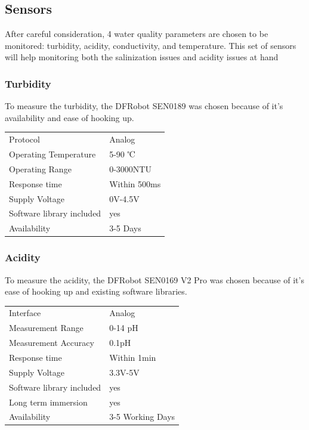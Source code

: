 \newpage
\subsection{Sensors}
After careful consideration, 4 water quality parameters are chosen to be monitored: turbidity, acidity, conductivity, and temperature. This set of sensors will help monitoring both the salinization issues and acidity issues at hand

\subsubsection{Turbidity}
To measure the turbidity, the DFRobot SEN0189 \cite{SEN0189} was chosen because of it's availability and ease of hooking up.
\begin{table}[h!]
	\centering
	\quad
	\begin{tabular}{| l | l |}
    \hline
    Protocol & Analog\\
    Operating Temperature & 5-90 ℃ \\
    Operating Range &  0-3000NTU\\
    Response time & Within 500ms \\
    Supply Voltage & 0V-4.5V \\
    Software library included & yes \\
    Availability & 3-5 Days \\
    \hline
	\end{tabular}
\end{table}

\subsubsection{Acidity}
To measure the acidity, the DFRobot SEN0169 V2 Pro \cite{SEN0169V2} was chosen because of it's ease of hooking up and existing software libraries.
\begin{table}[h!]
	\centering
	\quad
	\begin{tabular}{| l | l |}
    \hline
    Interface & Analog \\
    Measurement Range & 0-14 pH \\
    Measurement Accuracy &  0.1pH \\
    Response time & Within 1\gls{min} \\
    Supply Voltage & 3.3V-5V \\
    Software library included & yes \\
    Long term immersion & yes \\
    Availability & 3-5 Working Days \\
    \hline
	\end{tabular}
\end{table}

